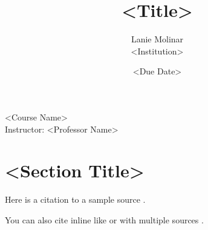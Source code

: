 \documentclass[12pt,letterpaper]{article}
\title{<Title>}
\author{Lanie Molinar\\<Institution>}
\date{<Due Date>}
\begin{document}
\begin{titlepage}
\maketitle
\thispagestyle{fancy}

\begin{center}
<Course Name>\\
Instructor: <Professor Name>
\end{center}
\end{titlepage}

\section{<Section Title>}

Here is a citation to a sample source \parencite{smith2020}.

You can also cite inline like \textcite{smith2020} or with multiple sources \parencite{smith2020,doe2021}.

\newpage

\printbibliography[heading=bibintoc]
\end{document}
